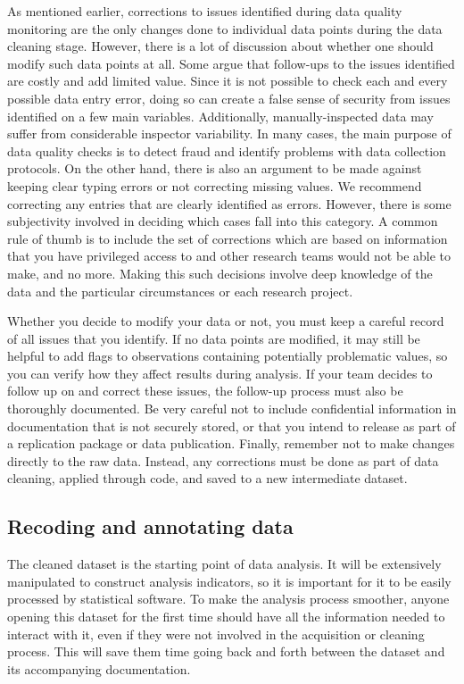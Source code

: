 As mentioned earlier,
corrections to issues identified during data quality monitoring are
the only changes done to individual data points during the data cleaning stage.
However, there is a lot of discussion about whether one should modify such data points at all.
Some argue that follow-ups to the issues identified are costly and add limited value.
Since it is not possible to check each and every possible data entry error,
doing so can create a false sense of security from issues identified on a few main variables.
Additionally, manually-inspected data may suffer from considerable inspector variability.
In many cases, the main purpose of data quality checks
is to detect fraud and identify problems with data collection protocols.
On the other hand, there is also an argument to be made
against keeping clear typing errors or not correcting missing values.
We recommend correcting any entries that are clearly identified as errors.
However, there is some subjectivity involved in deciding
which cases fall into this category.
A common rule of thumb is to include the set of corrections
which are based on information that you have privileged access to
and other research teams would not be able to make, and no more.
Making this such decisions involve deep knowledge of the data and
the particular circumstances or each research project.

Whether you decide to modify your data or not,
you must keep a careful record of all issues that you identify.
If no data points are modified,
it may still be helpful to add flags to observations containing
potentially problematic values,
so you can verify how they affect results during analysis.
If your team decides to follow up on and correct these issues,
the follow-up process must also be thoroughly documented.
Be very careful not to include confidential information in documentation that is not securely stored,
or that you intend to release as part of a replication package or data publication.
Finally, remember not to make changes directly to the raw data.
Instead, any corrections must be done as part of data cleaning,
applied through code, and saved to a new intermediate dataset.

\subsection{Recoding and annotating data}

The cleaned dataset is the starting point of data analysis.
It will be extensively manipulated to construct analysis indicators,
so it is important for it to be easily processed by statistical software.
To make the analysis process smoother,
anyone opening this dataset for the first time should have all the information needed to interact with it,
even if they were not involved in the acquisition or cleaning process.
This will save them time going back and forth between the dataset and its accompanying documentation.

